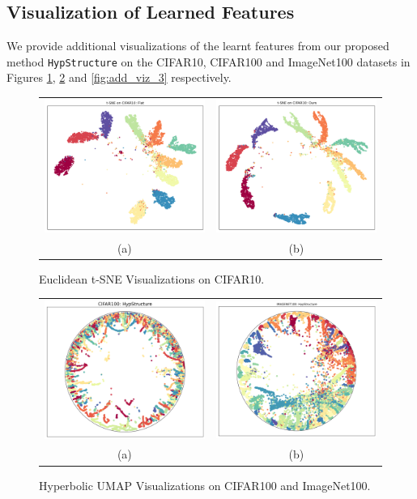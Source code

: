 \subsection{Visualization of Learned Features}
\label{app:sec_add_hyperbolic_viz}

We provide additional visualizations of the learnt features from our proposed method \texttt{HypStructure} on the CIFAR10, CIFAR100 and ImageNet100 datasets in Figures \ref{fig:add_viz_1}, \ref{fig:add_viz_2} and \ref{fig:add_viz_3} respectively. 

\begin{figure}[ht]
\centering
\begin{tabular}{cc}
\includegraphics[width=.3\textwidth]{figures/cifar10_tsne_flat.png}&
\includegraphics[width=.3\textwidth]{figures/cifar10_tsne_ours.png}\\
{ (a)}&{ (b)} 
\end{tabular}
\caption{Euclidean t-SNE Visualizations on CIFAR10.}
\label{fig:add_viz_1}
\end{figure}


\begin{figure}[ht]
\centering
\begin{tabular}{cc}
\includegraphics[width=.3\textwidth]{figures/hypstructure_poincare_disk_cifar100.png}&
\includegraphics[width=.3\textwidth]{figures/hypstructure_poincare_disk_imagenet100.png}\\
{ (a)}&{ (b)} 
\end{tabular}
\caption{Hyperbolic UMAP Visualizations on CIFAR100 and ImageNet100.}
\label{fig:add_viz_2}
\end{figure}

